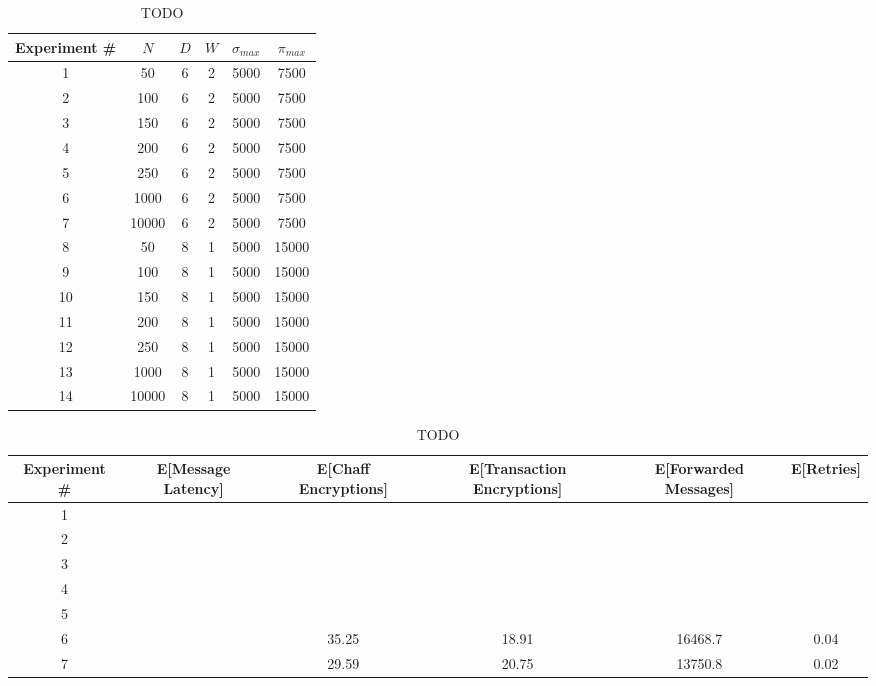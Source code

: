 \begin{table}
\begin{center}
\caption{TODO}
\label{tab:sim-results}
    \begin{tabular}{|c|c|c|c|c|c|} \hline
    {\bf Experiment \#} & $N$ & $D$ & $W$ & $\sigma_{max}$ & $\pi_{max}$ \\ \hline
    1 & 50     & 6 & 2 & 5000 & 7500 \\ 
    2 & 100    & 6 & 2 & 5000 & 7500 \\ 
    3 & 150    & 6 & 2 & 5000 & 7500 \\ 
    4 & 200    & 6 & 2 & 5000 & 7500 \\ 
    5 & 250    & 6 & 2 & 5000 & 7500 \\ 
    6 & 1000   & 6 & 2 & 5000 & 7500 \\ 
    7 & 10000  & 6 & 2 & 5000 & 7500 \\ 
    8 & 50     & 8 & 1 & 5000 & 15000 \\ 
    9 & 100    & 8 & 1 & 5000 & 15000 \\ 
    10 & 150   & 8 & 1 & 5000 & 15000 \\ 
    11 & 200   & 8 & 1 & 5000 & 15000 \\ 
    12 & 250   & 8 & 1 & 5000 & 15000 \\ 
    13 & 1000  & 8 & 1 & 5000 & 15000 \\ 
    14 & 10000 & 8 & 1 & 5000 & 15000 \\ 


    \hline
    \end{tabular}
\end{center}
\end{table}

\begin{table}
\begin{center}
\caption{TODO}
\label{tab:sim-results}
    \begin{tabular}{|c|c|c|c|c|c|} \hline
    {\bf Experiment \#} & {\bf E[Message Latency]} & {\bf E[Chaff Encryptions]} & {\bf E[Transaction Encryptions]} & {\bf E[Forwarded Messages]} & {\bf E[Retries]} \\ \hline
    1 & ~ & ~ & ~ & ~ & ~ \\ 
    2 & ~ & ~ & ~ & ~ & ~ \\ 
    3 & ~ & ~ & ~ & ~ & ~ \\ 
    4 & ~ & ~ & ~ & ~ & ~ \\ 
    5 & ~ & ~ & ~ & ~ & ~ \\ 
    6 & ~ & 35.25 & 18.91 & 16468.7 & 0.04 \\
    7 & ~ & 29.59 & 20.75 & 13750.8 & 0.02 \\ \hline
    \end{tabular}
\end{center}
\end{table}

